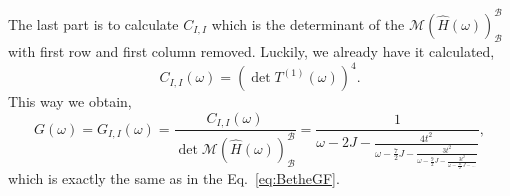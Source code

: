 \documentclass{article}
\begin{document}
The last part is to calculate $C_{I,I}$ which is the determinant of the $\mathcal{M}(\hat{H}(\omega))_\mathcal{B}^\mathcal{B}$ with first row and first column removed. Luckily, we already have it calculated,
\begin{equation}
    C_{I,I}(\omega) = \left(\det T^{(1)}(\omega) \right)^4.
\end{equation}
This way we obtain,
\begin{equation}
    G(\omega) = G_{I,I}(\omega) = \frac{C_{I,I}(\omega)}{\det \mathcal{M}(\hat{H}(\omega))_\mathcal{B}^\mathcal{B}} = \frac{1}{
        \omega - 2J - \frac{4t^2}{
            \omega - \frac{7}{2}J - \frac{3t^2}{
                \omega - \frac{9}{2}J - \frac{3t^2}{
                    \omega - \frac{11}{2}J - \hdots
                }
            }
        }
    },
\end{equation}
which is exactly the same as in the Eq.~\eqref{eq:BetheGF}. 
\end{document}
